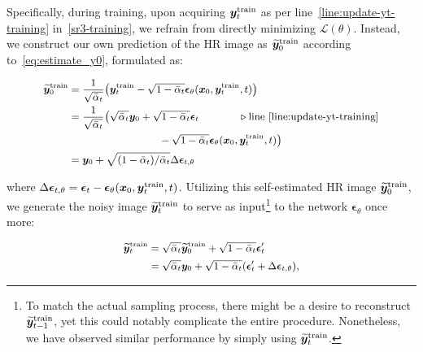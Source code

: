 Specifically, during training, upon acquiring ${\bm{y}}_t^{\text{train}}$ as per line~\ref{line:update-yt-training} in~\cref{sr3-training}, we refrain from directly  minimizing $\mathcal{L}(\theta)$. Instead,  we construct our own prediction of the HR image as $\widetilde{{\bm{y}}}_0^{\text{train}}$ according to~\cref{eq:estimate_y0}, formulated as:

\vspace{-.2in}
\begin{align}\label{eq:y0-train-drm}
\small
    \begin{split}
    \widetilde{\boldsymbol{y}}_0^{\text{train}}&=\frac{1}{\sqrt{\bar{\alpha}_t}}\big(\boldsymbol{y}_t^{\text{train}}-\sqrt{1-\bar{\alpha}_t} \bm\epsilon_\theta(\boldsymbol{x}_0, \boldsymbol{y}_t^{\text{train}}, t)\big)\\
        &=\frac{1}{\sqrt{\bar{\alpha}_t}}\big( \sqrt{\bar{\alpha}_t}{\bm{y}}_0 + \sqrt{1-\bar{\alpha}_t}\bm{{\mathbf{\epsilon}}}_t    \hspace{.48in}\triangleright\text{line~\ref{line:update-yt-training}}   \\
        &\hspace{1.1in}-\sqrt{1-\bar{\alpha}_t} \bm\epsilon_\theta(\boldsymbol{x}_0, \boldsymbol{y}_t^{\text{train}}, t)\big)\\
        &={\bm{y}}_0 + \sqrt{(1-\bar{\alpha}_t)/{\bar{\alpha}_t}} \Delta\bm{{\mathbf{\epsilon}}}_{t,\theta}
    \end{split}
\end{align}
\vspace{-.15in}

\noindent
where $\Delta\bm{{\mathbf{\epsilon}}}_{t,\theta} = \bm{{\mathbf{\epsilon}}}_t-\bm{{\mathbf{\epsilon}}}_{\mathbf{\theta}}({\bm{x}}_0,{\bm{y}}_t^{\text{train}},t)$. Utilizing this self-estimated HR image $\widetilde{{\bm{y}}}_0^{\text{train}}$,  we generate the noisy image $\widetilde{{\bm{y}}}_t^{\text{train}}$ to serve as input\footnote{To match the actual sampling process, there might be a desire to reconstruct $ \widetilde{{\bm{y}}}_{t-1}^{\text{train}}$, yet this could notably complicate the entire procedure. Nonetheless, we have observed similar performance by simply using $ \widetilde{{\bm{y}}}_t^{\text{train}}$.} to the network $\bm\epsilon_\theta$ once more:

\vspace{-.2in}
\begin{align}\label{eq:self-supervise}
\small
\begin{split}
    \widetilde{{\bm{y}}}_t^{\text{train}} &= \sqrt{\bar{\alpha}_t}\widetilde{{\bm{y}}}_0^{\text{train}}+\sqrt{1-\bar{\alpha}_t}\bm\epsilon'_t\\
    &= \sqrt{\bar{\alpha}_t}{\bm{y}}_0+ \sqrt{1-\bar{\alpha}_t}(\bm \epsilon'_t+\Delta\bm{{\mathbf{\epsilon}}}_{t,\theta}),
\end{split}
\end{align}
\vspace{-.15in}

